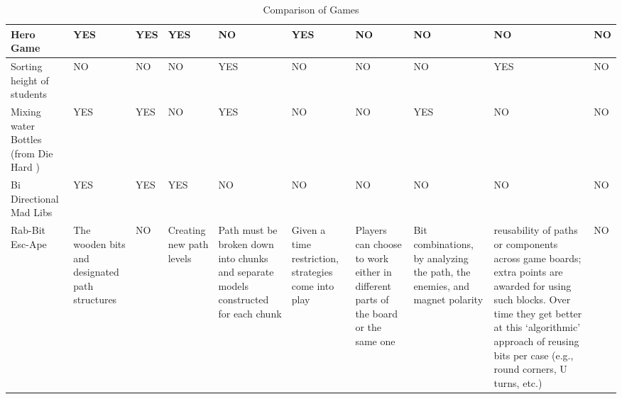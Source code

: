 \documentclass{acm_proc_article-sp}
\begin{document}
\begin{sidewaystable}[htbp]
\begin{tabular}{|p{1.5cm}||p{1.5cm}|p{2.5cm}|p{2.5cm}|p{2.7cm}|p{2cm}|p{1.5cm}|p{2cm}|p{3.5cm}|p{1.5cm}|}
    Hero Game 
      & \cellcolor{blue!25}YES 
      & \cellcolor{blue!25}YES 
      & \cellcolor{blue!25}YES 
      & NO 
      & \cellcolor{blue!25}YES 
      & NO 
      & NO 
      & NO 
      & NO \\ \hline
    
    Sorting height of students 
      & NO 
      & NO 
      & NO 
      & \cellcolor{blue!25}YES 
      & NO 
      & NO 
      & NO 
      & \cellcolor{blue!25}YES 
      & NO \\ \hline
    
    
    Mixing water Bottles (from Die Hard \cite{diehard2008thorp}) 
      & \cellcolor{blue!25}YES 
      & \cellcolor{blue!25}YES 
      & NO 
      & \cellcolor{blue!25}YES 
      & NO 
      & NO 
      & \cellcolor{blue!25}YES 
      & NO 
      & NO \\ \hline
    
    Bi Directional Mad Libs 
      & \cellcolor{blue!25}YES 
      & \cellcolor{blue!25}YES 
      & \cellcolor{blue!25}YES 
      & NO 
      & NO 
      & NO 
      & NO 
      & NO 
      & NO \\ \hline
    
    Rab-Bit Esc-Ape 
      & \raggedright{The wooden bits and designated path structures} 
      & NO 
      & \raggedright{Creating new path levels} 
      & \raggedright{Path must be broken down into chunks and separate models constructed for each chunk} 
      & \raggedright{Given a time restriction, strategies come into play} 
      & \raggedright{Players can choose to work either in different parts of the board or the same one} 
      & \raggedright{Bit combinations, by analyzing the path, the enemies, and magnet polarity}
      & \raggedright{reusability of paths or components across game boards; extra points are awarded for using such blocks.
        Over time they get better at this `algorithmic' approach of reusing bits per case (e.g., round corners, U turns, etc.)} 
      & NO \\ \hline

    \end{tabular}\hspace*{-1cm}\vspace*{-1cm}
    \hspace*{1cm}\vspace*{1cm}\caption{Comparison of Games}
    \label{table:games-comparison}
\end{sidewaystable}
\end{document}

